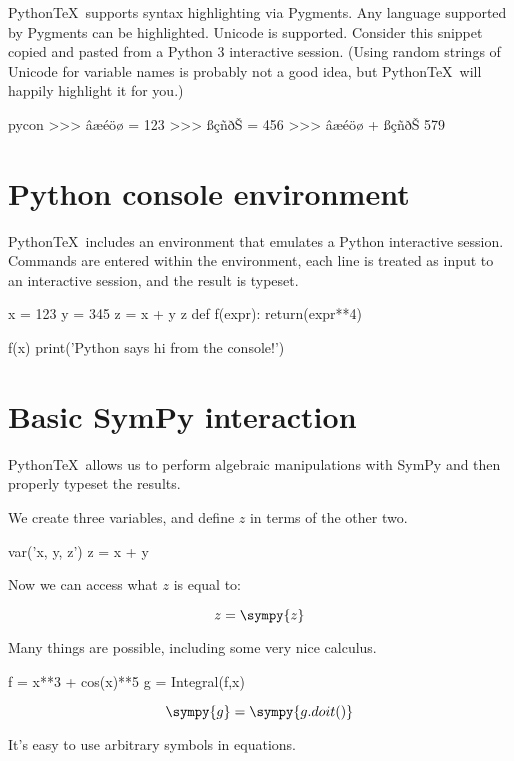 \documentclass[11pt]{article}
\newcommand{\pytex}{Python\TeX}
\begin{document}
\pytex\ supports syntax highlighting via Pygments.  Any language supported by Pygments can be highlighted.  Unicode is supported.  Consider this snippet copied and pasted from a Python 3 interactive session.  (Using random strings of Unicode for variable names is probably not a good idea, but \pytex\ will happily highlight it for you.)

\begin{pygments}{pycon}
>>> âæéöø = 123
>>> ßçñðŠ = 456
>>> âæéöø + ßçñðŠ
579
\end{pygments}


\section{Python console environment}

\pytex\ includes an environment that emulates a Python interactive session.  Commands are entered within the environment, each line is treated as input to an interactive session, and the result is typeset.

\begin{pyconsole}[][frame=single]
x = 123
y = 345
z = x + y
z
def f(expr):
    return(expr**4)

f(x)
print('Python says hi from the console!')
\end{pyconsole}


\section{Basic SymPy interaction}

\pytex\ allows us to perform algebraic manipulations with SymPy and then properly typeset the results.

We create three variables, and define $z$ in terms of the other two.

\begin{sympyblock}
var('x, y, z')
z = x + y
\end{sympyblock}

Now we can access what $z$ is equal to:

\[z=\sympy{z}\]

Many things are possible, including some very nice calculus.

\begin{sympyblock}
f = x**3 + cos(x)**5
g = Integral(f,x)
\end{sympyblock}

\[\sympy{g}=\sympy{g.doit()}\]

It's easy to use arbitrary symbols in equations.
\end{document}
